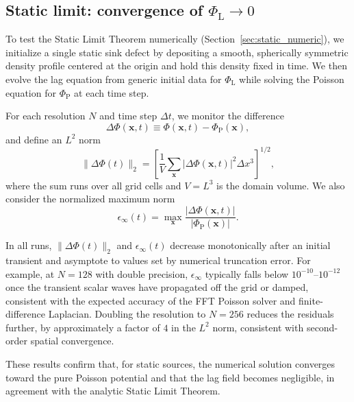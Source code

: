 \documentclass[11pt]{article}
\newcommand{\PhiP}{\Phi_{\mathrm{P}}}
\newcommand{\PhiL}{\Phi_{\mathrm{L}}}
\begin{document}
\subsection{Static limit: convergence of \texorpdfstring{$\PhiL \to 0$}{PhiL -> 0}}
\label{app:numerics_static_convergence}

To test the Static Limit Theorem numerically (Section~\ref{sec:static_numeric}), we initialize a single static sink defect by depositing a smooth, spherically symmetric density profile centered at the origin and hold this density fixed in time. We then evolve the lag equation from generic initial data for $\PhiL$ while solving the Poisson equation for $\PhiP$ at each time step.

For each resolution $N$ and time step $\Delta t$, we monitor the difference
\begin{equation}
  \Delta \Phi(\mathbf{x},t)
  \equiv \Phi(\mathbf{x},t) - \PhiP(\mathbf{x}),
\end{equation}
and define an $L^2$ norm
\begin{equation}
  \|\Delta \Phi(t)\|_2
  = \left[
      \frac{1}{V}
      \sum_{\mathbf{x}}
      \bigl|\Delta \Phi(\mathbf{x},t)\bigr|^2
      \Delta x^3
    \right]^{1/2},
 \end{equation}
where the sum runs over all grid cells and $V = L^3$ is the domain volume. We also consider the normalized maximum norm
\begin{equation}
  \epsilon_\infty(t)
  = \max_{\mathbf{x}}
    \frac{|\Delta \Phi(\mathbf{x},t)|}
         {|\PhiP(\mathbf{x})|}.
\end{equation}

In all runs, $\|\Delta \Phi(t)\|_2$ and $\epsilon_\infty(t)$ decrease monotonically after an initial transient and asymptote to values set by numerical truncation error. For example, at $N=128$ with double precision, $\epsilon_\infty$ typically falls below $10^{-10}$–$10^{-12}$ once the transient scalar waves have propagated off the grid or damped, consistent with the expected accuracy of the FFT Poisson solver and finite-difference Laplacian. Doubling the resolution to $N=256$ reduces the residuals further, by approximately a factor of $4$ in the $L^2$ norm, consistent with second-order spatial convergence.

These results confirm that, for static sources, the numerical solution converges toward the pure Poisson potential and that the lag field becomes negligible, in agreement with the analytic Static Limit Theorem.
\end{document}
